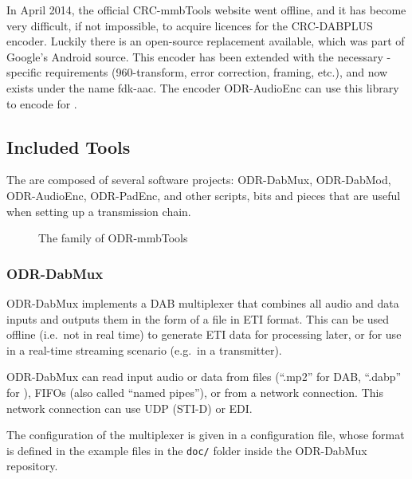 In April 2014, the official \mbox{CRC-mmbTools} website went offline, and it has
become very difficult, if not impossible, to acquire licences for the
\mbox{CRC-DABPLUS} encoder. Luckily there is an open-source replacement
available, which was part of Google's Android source. This encoder has been
extended with the necessary \dabplus{}-specific requirements (960-transform,
error correction, framing, etc.), and now exists under the name
\mbox{fdk-aac}. The encoder \mbox{ODR-AudioEnc} can use this library to encode for
\dabplus{}.

\subsection{Included Tools}
The \mmbtools are composed of several software projects:
\mbox{ODR-DabMux}, \mbox{ODR-DabMod},
\mbox{ODR-AudioEnc}, \mbox{ODR-PadEnc}, and other scripts, bits and pieces
that are useful when setting up a transmission chain.

\begin{figure}[h]
    \centering
    \caption{The family of ODR-mmbTools}
    \label{fig:family_mmbTools}
\end{figure}

\subsubsection{ODR-DabMux}
ODR-DabMux implements a DAB multiplexer that combines all audio and data inputs
and outputs them in the form of a file in ETI format. This can be used offline
(i.e.~not in real time) to generate ETI data for processing later, or for use in
a real-time streaming scenario (e.g.~in a transmitter).

ODR-DabMux can read input audio or data from files (``.mp2'' for DAB, ``.dabp'' for
\dabplus), FIFOs (also called ``named pipes''), or from a network connection. This
network connection can use UDP (STI-D) or EDI.

The configuration of the multiplexer is given in a configuration file, whose
format is defined in the example files in the \verb+doc/+ folder inside the
ODR-DabMux repository.


